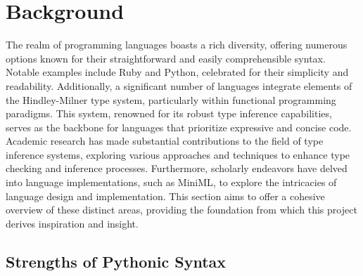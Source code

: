\documentclass{l4proj}
\begin{document}
    


\chapter{Background}

The realm of programming languages boasts a rich diversity, offering numerous options known for their straightforward and easily comprehensible syntax.
Notable examples include Ruby and Python, celebrated for their simplicity and readability.
Additionally, a significant number of languages integrate elements of the Hindley-Milner type system, particularly within functional programming paradigms.
This system, renowned for its robust type inference capabilities, serves as the backbone for languages that prioritize expressive and concise code.
Academic research has made substantial contributions to the field of type inference systems, exploring various approaches and techniques to enhance type checking and inference processes.
Furthermore, scholarly endeavors have delved into language implementations, such as MiniML, to explore the intricacies of language design and implementation.
This section aims to offer a cohesive overview of these distinct areas, providing the foundation from which this project derives inspiration and insight.


\section{Strengths of Pythonic Syntax}
\end{document}
